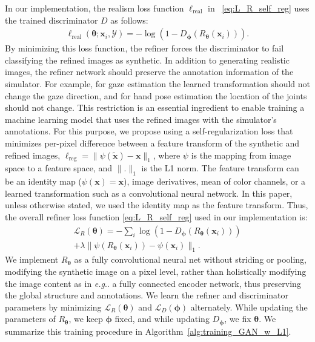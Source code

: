 \documentclass[10pt,twocolumn,letterpaper]{article}
\makeatletter
\DeclareRobustCommand\onedot{\futurelet\@let@token\@onedot}
\def\@onedot{\ifx\@let@token.\else.\null\fi\xspace}
\def\eg{\emph{e.g}\onedot} \def\Eg{\emph{E.g}\onedot}
\makeatother
\begin{document}
In our implementation, the realism loss function  $\ell_{\text{real}}$ in ~\eqref{eq:L_R_self_reg} uses the trained discriminator $D$ as follows:
\begin{align}
\ell_{\text{real}}  (\boldsymbol \theta; \mathbf x_i, \mathcal Y ) = -  \log (1 - D_{\boldsymbol \phi}(R_{\boldsymbol \theta}(\mathbf x_i) ) ) .
\end{align}
By minimizing this loss function, the refiner forces the discriminator to fail classifying the refined images as synthetic.
In addition to generating realistic images, the refiner network should preserve the annotation information of the simulator. 
For example, for gaze estimation the learned transformation should not change the gaze direction, and for hand pose estimation the location of the joints should not change. 
This restriction is an essential ingredient to enable training a machine learning model that uses the refined images with the simulator's annotations. 
For this purpose, we propose using a self-regularization loss that minimizes per-pixel difference between a feature transform of the synthetic and refined images,  $\ell_{\text{reg}} = \|\psi(\tilde{\mathbf x}) - \mathbf x\|_1 $, where
$\psi$ is the mapping from image space to a feature space, and $\|.\|_1$ is the L1 norm.
The feature transform can be an identity map ($\psi(\mathbf x) = \mathbf x$), image derivatives, mean of color channels, or a learned transformation such as a convolutional neural network. 
In this paper, unless otherwise stated, we used the identity map as the feature transform. 
Thus, the overall refiner loss function \eqref{eq:L_R_self_reg} used in our implementation is:
\begin{align}
{\mathcal L}_R (\boldsymbol \theta) = - \sum_i \log (1 - D_{\boldsymbol \phi}(R_{\boldsymbol \theta}(\mathbf x_i) ) )   \nonumber \\ 
	 + \lambda \| \psi(R_{\boldsymbol \theta}(\mathbf x_i)) - \psi(\mathbf x_i)\|_1.
\label{eq:L_R_i_self_reg}
\end{align}
We implement $R_{\boldsymbol \theta} $ as a fully convolutional neural net without striding or pooling,
modifying the synthetic  image on a pixel level, rather than holistically modifying the image content as in \eg a fully connected encoder network, thus preserving the global structure and annotations.
We learn  the refiner and discriminator parameters by minimizing $ {\mathcal L}_R (\boldsymbol \theta)$ and ${\mathcal L}_D (\boldsymbol \phi)$ alternately. 
While updating the parameters of $R_{\boldsymbol \theta}$, we keep $\boldsymbol \phi$ fixed, and while updating $D_{\boldsymbol \phi}$,  we fix  $\boldsymbol \theta$. We summarize this training procedure in Algorithm~\ref{alg:training_GAN_w_L1}.
\end{document}
